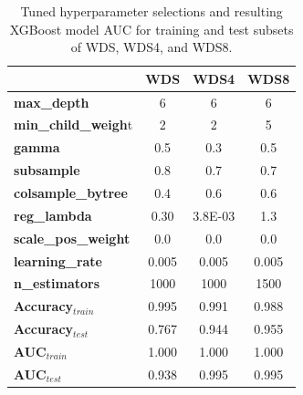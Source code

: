 \begin{table}[!htp]
    \centering
    \begin{tabular}{l|c|c|c|}
    \cline{2-4}
                                             & \textbf{WDS}   & \textbf{WDS4}    & \textbf{WDS8}  \\ \hline
    \multicolumn{1}{|l|}{\textbf{max\_depth}}         & 6     & 6       & 6     \\ \hline
    \multicolumn{1}{|l|}{\textbf{min\_child\_weigh}t} & 2     & 2       & 5     \\ \hline
    \multicolumn{1}{|l|}{\textbf{gamma}}              & 0.5   & 0.3     & 0.5   \\ \hline
    \multicolumn{1}{|l|}{\textbf{subsample}}          & 0.8   & 0.7     & 0.7   \\ \hline
    \multicolumn{1}{|l|}{\textbf{colsample\_bytree}}  & 0.4   & 0.6     & 0.6   \\ \hline
    \multicolumn{1}{|l|}{\textbf{reg\_lambda}}        & 0.30  & 3.8E-03 & 1.3   \\ \hline
    \multicolumn{1}{|l|}{\textbf{scale\_pos\_weight}} & 0.0   & 0.0     & 0.0   \\ \hline
    \multicolumn{1}{|l|}{\textbf{learning\_rate}}     & 0.005 & 0.005   & 0.005 \\ \hline
    \multicolumn{1}{|l|}{\textbf{n\_estimators}}      & 1000  & 1000    & 1500  \\ \hline
    \multicolumn{1}{|l|}{\textbf{Accuracy$_{train}$}} & 0.995 & 0.991   & 0.988 \\ \hline
    \multicolumn{1}{|l|}{\textbf{Accuracy$_{test}$}}  & 0.767 & 0.944   & 0.955 \\ \hline
    \multicolumn{1}{|l|}{\textbf{AUC$_{train}$}}      & 1.000 & 1.000   & 1.000 \\ \hline
    \multicolumn{1}{|l|}{\textbf{AUC$_{test}$}}       & 0.938 & 0.995   & 0.995 \\ \hline
    \end{tabular}
    \caption[XGBoost hyperparameter values]{Tuned hyperparameter selections and resulting XGBoost model AUC for training and test subsets of WDS, WDS4, and WDS8.}
    \label{tab:xgb_tuning}
\end{table}

